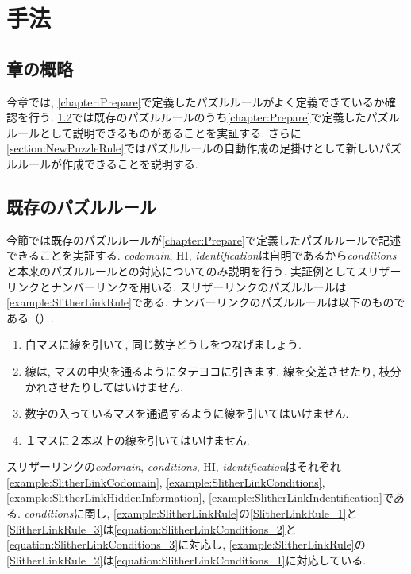 \chapter{手法}\label{chapter:3}
\section{章の概略}
今章では, \cref{chapter:Prepare}で定義したパズルルールがよく定義できているか確認を行う. \cref{section:ExistsPuzzleRule}では既存のパズルルールのうち\cref{chapter:Prepare}で定義したパズルルールとして説明できるものがあることを実証する.  さらに\cref{section:NewPuzzleRule}ではパズルルールの自動作成の足掛けとして新しいパズルルールが作成できることを説明する.

\section{既存のパズルルール}\label{section:ExistsPuzzleRule}
今節では既存のパズルルールが\cref{chapter:Prepare}で定義したパズルルールで記述できることを実証する. \textit{codomain}, HI, \textit{identification}は自明であるから\textit{conditions}と本来のパズルルールとの対応についてのみ説明を行う.
実証例としてスリザーリンクとナンバーリンクを用いる. スリザーリンクのパズルルールは\cref{example:SlitherLinkRule}である. ナンバーリンクのパズルルールは以下のものである（\cite{web:NumberLink}）.
\begin{example}[ナンバーリンクのパズルルール]\label{example:NumberLinkRule}\textup{}
  \begin{enumerate}
    \item 白マスに線を引いて, 同じ数字どうしをつなげましょう.\label{NumberLinkRule_1}
    \item 線は, マスの中央を通るようにタテヨコに引きます. 線を交差させたり, 枝分かれさせたりしてはいけません.\label{NumberLinkRule_2}
    \item 数字の入っているマスを通過するように線を引いてはいけません.\label{NumberLinkRule_3}
    \item １マスに２本以上の線を引いてはいけません.\label{NumberLinkRule_4}
  \end{enumerate}
\end{example}

\begin{example}[スリザーリンクの数学的記述]
  スリザーリンクの\textit{codomain}, \textit{conditions},  HI, \textit{identification}はそれぞれ\cref{example:SlitherLinkCodomain}, \cref{example:SlitherLinkConditions}, \cref{example:SlitherLinkHiddenInformation}, \cref{example:SlitherLinkIndentification}である. \textit{conditions}に関し, \cref{example:SlitherLinkRule}の\ref{SlitherLinkRule_1}と\ref{SlitherLinkRule_3}は\cref{equation:SlitherLinkConditions_2}と\cref{equation:SlitherLinkConditions_3}に対応し, \cref{example:SlitherLinkRule}の\ref{SlitherLinkRule_2}は\cref{equation:SlitherLinkConditions_1}に対応している.
\end{example}

